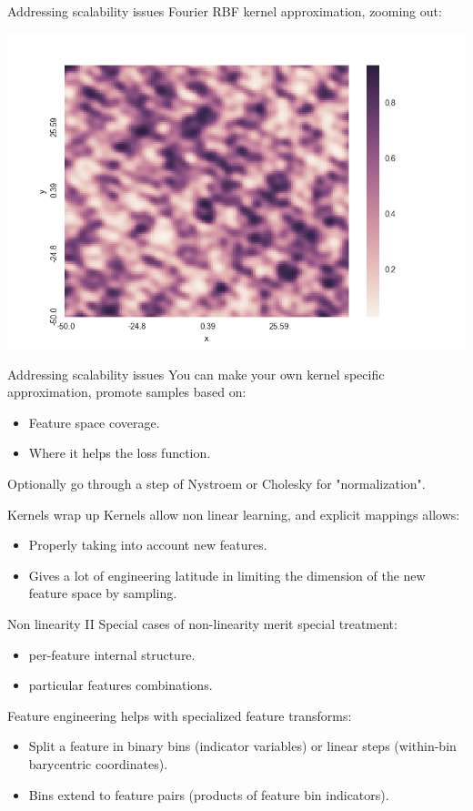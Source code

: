 \documentclass[11pt]{beamer}
\begin{document}
\begin{frame}{Addressing scalability issues}
Fourier RBF kernel approximation, zooming out:
\begin{center}
\includegraphics[scale=0.3]{arcs_rbfsampler_above.png} 
\end{center}
\end{frame}

\begin{frame}{Addressing scalability issues}
You can make your own kernel specific approximation, promote samples based on:
\begin{itemize}
\item Feature space coverage.
\item Where it helps the loss function.
\end{itemize}
Optionally go through a step of Nystroem or Cholesky for "normalization".

\end{frame}

\begin{frame}{Kernels wrap up}
Kernels allow non linear learning, and explicit mappings allows:
\begin{itemize}
\item Properly taking into account new features.
\item Gives a lot of engineering latitude in limiting the dimension of the new feature space by sampling.
\end{itemize}
\end{frame}

\begin{frame}{Non linearity II}
Special cases of non-linearity merit special treatment:
\begin{itemize}
\item per-feature internal structure.
\item particular features combinations.
\end{itemize}
\pause
Feature engineering helps with specialized feature transforms:
\begin{itemize}
\item Split a feature in binary bins (indicator variables) or linear steps (within-bin barycentric coordinates).
\item Bins extend to feature pairs (products of feature bin indicators).
\end{itemize}
\end{frame}
\end{document}
